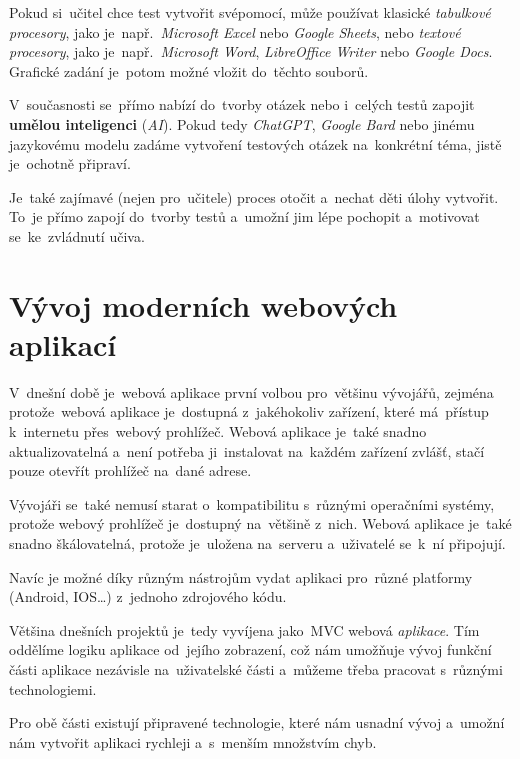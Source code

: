 \documentclass[11pt,a4paper]{report}
\begin{document}
            Pokud si~učitel chce test vytvořit svépomocí, může používat klasické \emph{tabulkové procesory}, jako je~např.~\emph{Microsoft Excel} nebo \emph{Google Sheets}, nebo \emph{textové procesory}, jako je~např.~\emph{Microsoft Word}, \emph{LibreOffice Writer} nebo \emph{Google Docs}. Grafické zadání je~potom možné vložit do~těchto souborů.

            V~současnosti se~přímo nabízí do~tvorby otázek nebo i~celých testů zapojit \textbf{umělou inteligenci} (\emph{AI}). Pokud tedy \emph{ChatGPT}, \emph{Google Bard} nebo jinému jazykovému modelu zadáme vytvoření testových otázek na~konkrétní téma, jistě je~ochotně připraví.

            Je~také zajímavé (nejen pro~učitele) proces otočit a~nechat děti úlohy vytvořit. To~je přímo zapojí do~tvorby testů a~umožní jim lépe pochopit a~motivovat se~ke~zvládnutí učiva. \cite{hedlovam:chybavresenim}

    \chapter{Vývoj moderních webových aplikací}
        V~dnešní době je~webová aplikace první volbou pro~většinu vývojářů, zejména protože~webová aplikace je~dostupná z~jakéhokoliv zařízení, které má~přístup k~internetu přes~webový prohlížeč. Webová aplikace je~také snadno aktualizovatelná a~není potřeba ji~instalovat na~každém zařízení zvlášť, stačí pouze otevřít prohlížeč na~dané adrese.
        
        Vývojáři se~také nemusí starat o~kompatibilitu s~různými operačními systémy, protože webový prohlížeč
        je~dostupný na~většině z~nich. Webová aplikace je~také snadno škálovatelná, protože je~uložena na~serveru a~uživatelé se~k~ní připojují.
        
        Navíc je možné díky různým nástrojům vydat aplikaci pro~různé platformy (Android, IOS\dots) z~jednoho zdrojového kódu.\cite{adobe:webapp}

        Většina dnešních projektů je~tedy vyvíjena jako~MVC webová \emph{aplikace}. Tím oddělíme logiku aplikace od~jejího zobrazení, což nám umožňuje vývoj funkční části aplikace nezávisle na~uživatelské části a~můžeme třeba pracovat s~různými technologiemi.
        
        Pro obě části existují připravené technologie, které nám usnadní vývoj a~umožní nám vytvořit aplikaci rychleji a~s~menším množstvím chyb.

        \cite{itnetworkBestPractices}
\end{document}
